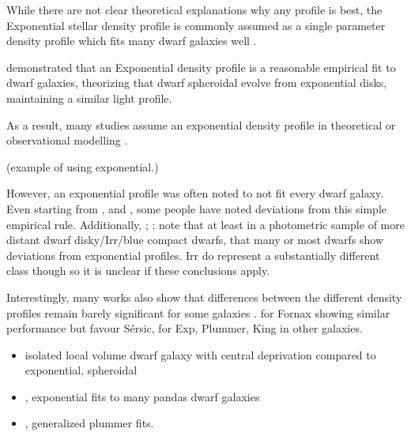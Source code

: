 While there are not clear theoretical explanations why any profile is
best, the Exponential stellar density profile is commonly assumed as a
single parameter density profile which fits many dwarf galaxies well
\citetext{\citealp[e.g.,][]{eskridge1988a}; \citealp{hodge1971a}; \citealp{hodge1991b}; \citealp{IH1995}; \citealp[
but with nuclear regions and only for Mb \textless{} -16
virgo]{binggeli+cameron1991}; \citealp{caldwell+bothun1987}; \citealp{simon+2005}}.

\citet{faber+lin1983} demonstrated that an Exponential density profile
is a reasonable empirical fit to dwarf galaxies, theorizing that dwarf
spheroidal evolve from exponential disks, maintaining a similar light
profile.

As a result, many studies assume an exponential density profile in
theoretical or observational modelling
\citep[e.g.,][]{MV2020a, kowalczyk+2013}.

\citet{lelli+2014} (example of using exponential.)

However, an exponential profile was often noted to not fit every dwarf
galaxy. Even starting from \citet{aparicio1997}, and \citet[for coma
cluster dE]{graham+guzman2003}, some people have noted deviations from
this simple empirical rule. Additionally, \citet{hunter+elmegreen};
\citet{herrmann+hunter+elmegreen2013};
\citet{herrmann+hunter+elmegreen2016} note that at least in a
photometric sample of more distant dwarf disky/Irr/blue compact dwarfs,
that many or most dwarfs show deviations from exponential profiles. Irr
do represent a substantially different class though so it is unclear if
these conclusions apply.

Interestingly, many works also show that differences between the
different density profiles remain barely significant for some galaxies
\citep[e.g.,][]{cicuendez+2018}. \citet{wang+2019} for Fornax showing
similar performance but favour Sérsic, \citet{mcconnachie+irwin2006} for
Exp, Plummer, King in other galaxies.

\begin{itemize}
\item
  \citet{makarov+2012} isolated local volume dwarf galaxy with central
  deprivation compared to exponential, spheroidal
\item
  \citet{martin+2016}, exponential fits to many pandas dwarf galaxies
\item
  \citet{moskowitz+walker2020}, generalized plummer fits.
\end{itemize}

